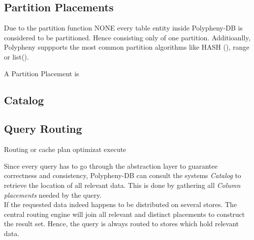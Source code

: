 \subsection{Partition Placements}
Due to the partition function NONE every table entity inside Polypheny-DB is considered to be partitioned.  Hence consisting only of one partition.
Additioanlly, Polypheny suppports the most common partition algorithms like HASH (), range or list(). 

A Partition Placement is 




\subsection{Catalog}


\subsection{Query Routing}

Routing or cache plan optimizat execute

Since every query has to go through the abstraction layer to guarantee correctness 
and consistency, Polypheny-DB can consult the systems \textit{Catalog} to retrieve the
location of all relevant data. This is done by gathering all 
\textit{Column placements} needed by the query.\\ 
If the requested data indeed happens to be distributed
on several stores. The central routing engine will join all relevant and distinct 
placements to construct the result set. Hence, the query is always routed to stores which 
hold relevant data.


